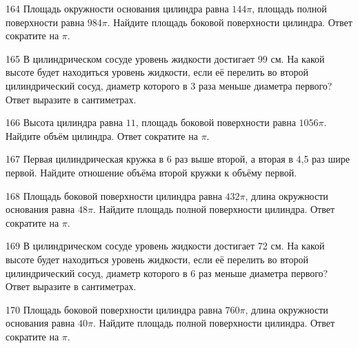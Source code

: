 \documentclass[4apaper]{article}
\begin{document}
\begin{taskBN}{164}
Площадь окружности основания цилиндра равна $144\pi$, площадь полной поверхности равна $984\pi$. Найдите площадь боковой поверхности цилиндра. Ответ сократите на $\pi$.
\end{taskBN}

\begin{taskBN}{165}
В цилиндрическом сосуде уровень жидкости достигает 99 см. На какой высоте будет находиться уровень жидкости, если её перелить во второй цилиндрический сосуд, диаметр которого в 3 раза меньше диаметра первого? Ответ выразите в сантиметрах.
\end{taskBN}

\begin{taskBN}{166}
Высота цилиндра равна $11$, площадь боковой поверхности равна $1056\pi$. Найдите объём цилиндра. Ответ сократите на $\pi$.
\end{taskBN}

\begin{taskBN}{167}
 Первая цилиндрическая кружка в 6 раз выше второй, а вторая в 4,5 раз шире первой. Найдите отношение объёма второй кружки к объёму первой.
\end{taskBN}

\begin{taskBN}{168}
Площадь боковой поверхности цилиндра равна $432\pi$, длина окружности основания равна $48\pi$. Найдите площадь полной поверхности цилиндра. Ответ сократите на $\pi$.
\end{taskBN}

\begin{taskBN}{169}
В цилиндрическом сосуде уровень жидкости достигает 72 см. На какой высоте будет находиться уровень жидкости, если её перелить во второй цилиндрический сосуд, диаметр которого в 6 раз меньше диаметра первого? Ответ выразите в сантиметрах.
\end{taskBN}

\begin{taskBN}{170}
Площадь боковой поверхности цилиндра равна $760\pi$, длина окружности основания равна $40\pi$. Найдите площадь полной поверхности цилиндра. Ответ сократите на $\pi$.
\end{taskBN}
\end{document}
